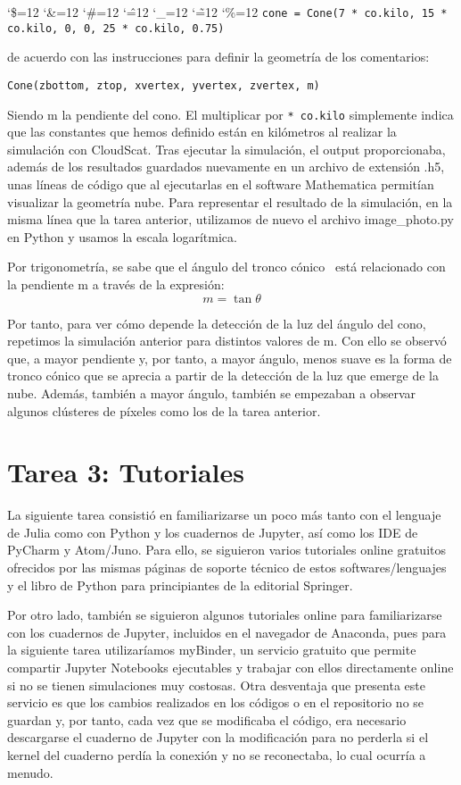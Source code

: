 \documentclass[10pt,letterpaper]{article}
\newenvironment{simplechar}{%
   \catcode`\$=12
   \catcode`\&=12
   \catcode`\#=12
   \catcode`\^=12
   \catcode`\_=12
   \catcode`\~=12
   \catcode`\%=12}{}
\begin{document}
\begin{simplechar}
\medskip
\noindent
\texttt{cone = Cone(7 * co.kilo, 15 * co.kilo, 0, 0, 25 * co.kilo, 0.75)}

\medskip
\noindent
de acuerdo con las instrucciones para definir la geometría de los comentarios:

\medskip
\texttt{Cone(zbottom, ztop, xvertex, yvertex, zvertex, m)}

\medskip
Siendo m la pendiente del cono. El multiplicar por \texttt{* co.kilo} simplemente indica que las constantes que hemos definido están en kilómetros al realizar la simulación con CloudScat. Tras ejecutar la simulación, el output proporcionaba, además de los resultados guardados nuevamente en un archivo de extensión .h5, unas líneas de código que al ejecutarlas en el software Mathematica permitían visualizar la geometría nube. Para representar el resultado de la simulación, en la misma línea que la tarea anterior, utilizamos de nuevo el archivo image_photo.py en Python y usamos la escala logarítmica. 


\bigskip
Por trigonometría, se sabe que el ángulo del tronco cónico
\straighttheta\, está relacionado con la pendiente m a través de la expresión: 
\begin{equation*}
m=\tan\theta
\end{equation*}

Por tanto, para ver cómo depende la detección de la luz del ángulo del cono, repetimos la simulación anterior para distintos valores de m. Con ello se observó que, a mayor pendiente y, por tanto, a mayor ángulo, menos suave es la forma de tronco cónico que se aprecia a partir de la detección de la luz que emerge de la nube. Además, también a mayor ángulo, también se empezaban a observar algunos clústeres de píxeles como los de la tarea anterior.


\section{Tarea 3: Tutoriales}
La siguiente tarea consistió en familiarizarse un poco más tanto con el lenguaje de Julia como con Python y los cuadernos de Jupyter, así como los IDE de PyCharm y Atom/Juno. Para ello, se siguieron varios tutoriales online gratuitos ofrecidos por las mismas páginas de soporte técnico de estos softwares/lenguajes y el libro de Python para principiantes de la editorial Springer.

\bigskip
Por otro lado, también se siguieron algunos tutoriales online para familiarizarse con los cuadernos de Jupyter, incluidos en el navegador de Anaconda, pues para la siguiente tarea utilizaríamos myBinder, un servicio gratuito que permite compartir Jupyter Notebooks ejecutables y trabajar con ellos directamente online si no se tienen simulaciones muy costosas. Otra desventaja que presenta este servicio es que los cambios realizados en los códigos o en el repositorio no se guardan y, por tanto, cada vez que se modificaba el código, era necesario descargarse el cuaderno de Jupyter con la modificación para no perderla si el kernel del cuaderno perdía la conexión y no se reconectaba, lo cual ocurría a menudo.


\end{simplechar}
\end{document}
